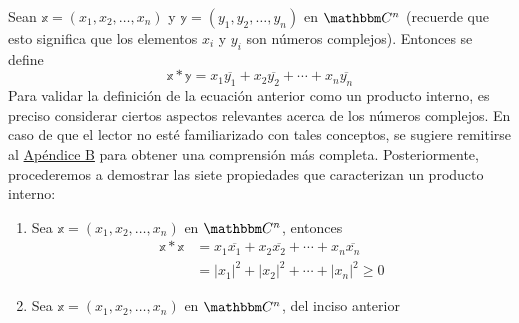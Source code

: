 \begin{example}\label{interno-usual_complejo}
    Sean $\mathbb{x} = (x_1, x_2, \dots, x_n)$ y $\mathbb{y} = (y_1, y_2, \dots, y_n)$ en $\CC[n]$ (recuerde que esto significa que los elementos $x_i$ y $y_i$ son números complejos). Entonces se define
    $$\mathbb{x} * \mathbb{y} = x_1\overline{y_1} + x_2\overline{y_2} + \cdots + x_n\overline{y_n}$$
    Para validar la definición de la ecuación anterior como un producto interno, es preciso considerar ciertos aspectos relevantes acerca de los números complejos. En caso de que el lector no esté familiarizado con tales conceptos, se sugiere remitirse al \hyperref[chap:numeros-complejos]{Apéndice B} para obtener una comprensión más completa. Posteriormente, procederemos a demostrar las siete propiedades que caracterizan un producto interno:
    \begin{enumerate}[label=\roman*)]
        \item Sea $\mathbb{x} = (x_1, x_2, \dots, x_n)$ en $\CC[n]$, entonces
        \begin{align*}
            \mathbb{x} * \mathbb{x} & = x_1\overline{x_1} + x_2\overline{x_2} + \cdots + x_n\overline{x_n} \\
            & = |x_1|^2 + |x_2|^2 + \cdots + |x_n|^2 \geq 0
        \end{align*}
        \item Sea $\mathbb{x} = (x_1, x_2, \dots, x_n)$ en $\CC[n]$, del inciso anterior

\end{enumerate}
\end{example}

